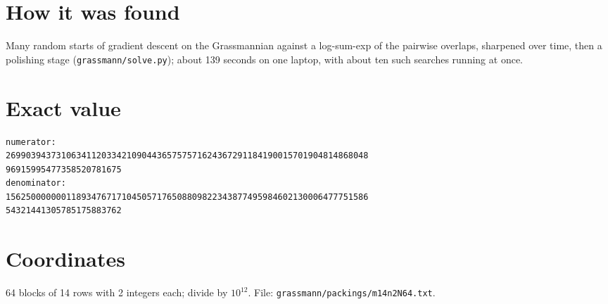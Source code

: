 \documentclass[11pt,a4paper]{article}
\begin{document}
\section{How it was found}
Many random starts of gradient descent on the Grassmannian against a log-sum-exp of the pairwise overlaps, sharpened over time, then a polishing stage (\texttt{grassmann/solve.py}); about 139 seconds on one laptop, with about ten such searches running at once.


\appendix
\section{Exact value}
{\small
\begin{verbatim}
numerator:
269903943731063411203342109044365757571624367291184190015701904814868048
96915995477358520781675
denominator:
156250000000118934767171045057176508809822343877495984602130006477751586
54321441305785175883762
\end{verbatim}}

\section{Coordinates}
64 blocks of 14 rows with 2 integers each; divide by $10^{12}$. File: \texttt{grassmann/packings/m14n2N64.txt}.
{\tiny
\begin{multicols}{4}
\end{multicols}}
\end{document}
